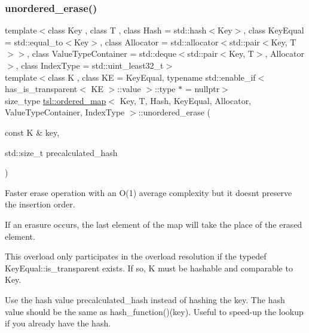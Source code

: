 \subsubsection{\texorpdfstring{unordered\_erase()}{unordered\_erase()}\hspace{0.1cm}{\footnotesize\ttfamily [6/6]}}
{\footnotesize\ttfamily template$<$class Key , class T , class Hash  = std\+::hash$<$\+Key$>$, class Key\+Equal  = std\+::equal\+\_\+to$<$\+Key$>$, class Allocator  = std\+::allocator$<$std\+::pair$<$\+Key, T$>$$>$, class Value\+Type\+Container  = std\+::deque$<$std\+::pair$<$\+Key, T$>$, Allocator$>$, class Index\+Type  = std\+::uint\+\_\+least32\+\_\+t$>$ \\
template$<$class K , class KE  = Key\+Equal, typename std\+::enable\+\_\+if$<$ has\+\_\+is\+\_\+transparent$<$ K\+E $>$\+::value $>$\+::type $\ast$  = nullptr$>$ \\
size\+\_\+type \mbox{\hyperlink{classtsl_1_1ordered__map}{tsl\+::ordered\+\_\+map}}$<$ Key, T, Hash, Key\+Equal, Allocator, Value\+Type\+Container, Index\+Type $>$\+::unordered\+\_\+erase (\begin{DoxyParamCaption}\item[{const K \&}]{key,  }\item[{std\+::size\+\_\+t}]{precalculated\+\_\+hash }\end{DoxyParamCaption})\hspace{0.3cm}{\ttfamily [inline]}}





Faster erase operation with an O(1) average complexity but it doesn\textquotesingle{}t preserve the insertion order.

If an erasure occurs, the last element of the map will take the place of the erased element.

This overload only participates in the overload resolution if the typedef Key\+Equal\+::is\+\_\+transparent exists. If so, K must be hashable and comparable to Key.

Use the hash value \textquotesingle{}precalculated\+\_\+hash\textquotesingle{} instead of hashing the key. The hash value should be the same as hash\+\_\+function()(key). Useful to speed-\/up the lookup if you already have the hash. \mbox{\label{classtsl_1_1ordered__map_abb69bca0a80def48ae806078d77175cb}} 
